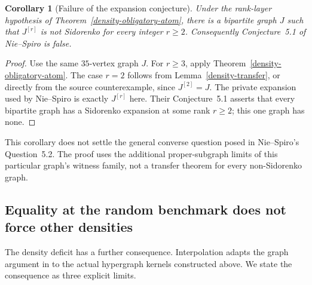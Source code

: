 \documentclass[a4paper,11pt,reqno]{amsart}
\theoremstyle{plain}
\newtheorem{corollary}[theorem]{Corollary}
\theoremstyle{definition}
\theoremstyle{remark}
\begin{document}
\begin{corollary}[Failure of the expansion conjecture]
\label{density-nie-spiro}
Under the rank-layer hypothesis of
Theorem~\ref{density-obligatory-atom}, there is a bipartite graph
$J$ such that $J^{[r]}$ is not Sidorenko for every integer $r\ge2$.
Consequently Conjecture~5.1 of Nie--Spiro \cite{niespiro2025} is false.
\end{corollary}
\begin{proof}
Use the same $35$-vertex graph $J$.
For $r\ge3$, apply Theorem~\ref{density-obligatory-atom}.
The case $r=2$ follows from Lemma~\ref{density-transfer}, or directly
from the source counterexample, since $J^{[2]}=J$.
The private expansion used by Nie--Spiro is exactly $J^{[r]}$ here.  Their Conjecture~5.1 asserts that every
bipartite graph has a Sidorenko expansion at some rank $r\ge2$;
this one graph has none.
\end{proof}

This corollary does not settle the general converse question posed
in Nie--Spiro's Question~5.2.  The proof uses the additional
proper-subgraph limits of this particular graph's witness family,
not a transfer theorem for every non-Sidorenko graph.

\subsection{Equality at the random benchmark does not force other densities}

The density deficit has a further consequence.  Interpolation adapts
the graph argument in \citep[Section~8]{openai161} to the actual
hypergraph kernels constructed above.  We state the consequence as
three explicit limits.
\end{document}
